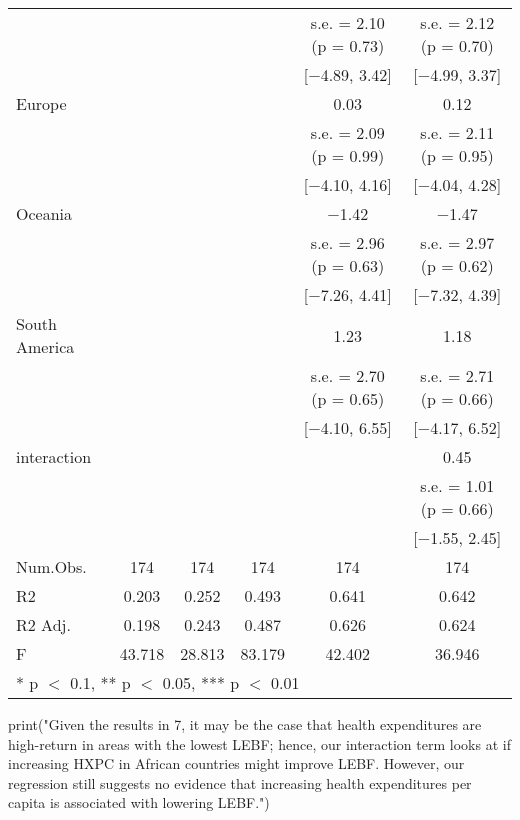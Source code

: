 \documentclass[
]{article}
\newenvironment{Shaded}{\begin{snugshade}}{\end{snugshade}}
\newcommand{\FunctionTok}[1]{\textcolor[rgb]{0.00,0.00,0.00}{#1}}
\newcommand{\NormalTok}[1]{#1}
\newcommand{\StringTok}[1]{\textcolor[rgb]{0.31,0.60,0.02}{#1}}
\begin{document}
\begin{table}
\begin{tabular}[t]{lccccc}
 &  &  &  & s.e. = \num{2.10} (p = \num{0.73}) & s.e. = \num{2.12} (p = \num{0.70})\\
 &  &  &  & {}[\num{-4.89}, \num{3.42}] & {}[\num{-4.99}, \num{3.37}]\\
Europe &  &  &  & \num{0.03} & \num{0.12}\\
 &  &  &  & s.e. = \num{2.09} (p = \num{0.99}) & s.e. = \num{2.11} (p = \num{0.95})\\
 &  &  &  & {}[\num{-4.10}, \num{4.16}] & {}[\num{-4.04}, \num{4.28}]\\
Oceania &  &  &  & \num{-1.42} & \num{-1.47}\\
 &  &  &  & s.e. = \num{2.96} (p = \num{0.63}) & s.e. = \num{2.97} (p = \num{0.62})\\
 &  &  &  & {}[\num{-7.26}, \num{4.41}] & {}[\num{-7.32}, \num{4.39}]\\
South America &  &  &  & \num{1.23} & \num{1.18}\\
 &  &  &  & s.e. = \num{2.70} (p = \num{0.65}) & s.e. = \num{2.71} (p = \num{0.66})\\
 &  &  &  & {}[\num{-4.10}, \num{6.55}] & {}[\num{-4.17}, \num{6.52}]\\
interaction &  &  &  &  & \num{0.45}\\
 &  &  &  &  & s.e. = \num{1.01} (p = \num{0.66})\\
 &  &  &  &  & {}[\num{-1.55}, \num{2.45}]\\
\midrule
Num.Obs. & \num{174} & \num{174} & \num{174} & \num{174} & \num{174}\\
R2 & \num{0.203} & \num{0.252} & \num{0.493} & \num{0.641} & \num{0.642}\\
R2 Adj. & \num{0.198} & \num{0.243} & \num{0.487} & \num{0.626} & \num{0.624}\\
F & \num{43.718} & \num{28.813} & \num{83.179} & \num{42.402} & \num{36.946}\\
\bottomrule
\multicolumn{6}{l}{\rule{0pt}{1em}* p $<$ 0.1, ** p $<$ 0.05, *** p $<$ 0.01}\\
\end{tabular}
\end{table}

\begin{Shaded}
\begin{Highlighting}[]
\FunctionTok{print}\NormalTok{(}\StringTok{"Given the results in 7, it may be the case that health expenditures are high{-}return in areas with the lowest LEBF; hence, our interaction term looks at if increasing HXPC in African countries might improve LEBF. However, our regression still suggests no evidence that increasing health expenditures per capita is associated with lowering LEBF."}\NormalTok{)}
\end{Highlighting}
\end{Shaded}
\end{document}
